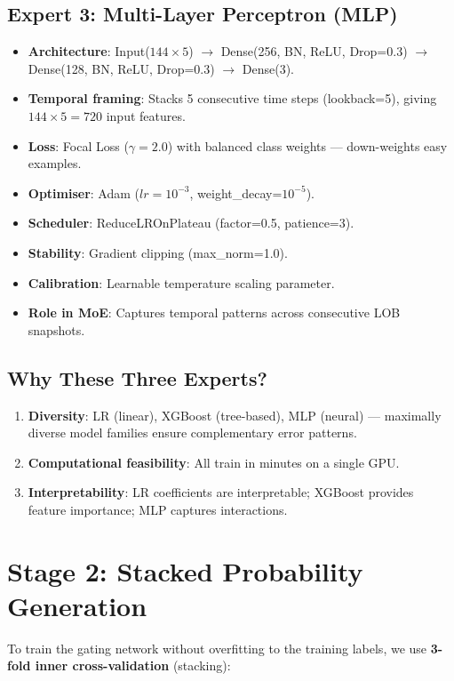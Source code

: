 \documentclass[12pt, a4paper]{article}
\begin{document}
\subsection{Expert 3: Multi-Layer Perceptron (MLP)}
\begin{itemize}
  \item \textbf{Architecture}: Input($144 \times 5$) $\to$ Dense(256, BN, ReLU, Drop=0.3) $\to$ Dense(128, BN, ReLU, Drop=0.3) $\to$ Dense(3).
  \item \textbf{Temporal framing}: Stacks 5 consecutive time steps (lookback=5), giving $144 \times 5 = 720$ input features.
  \item \textbf{Loss}: Focal Loss ($\gamma=2.0$) with balanced class weights — down-weights easy examples.
  \item \textbf{Optimiser}: Adam ($lr=10^{-3}$, weight\_decay=$10^{-5}$).
  \item \textbf{Scheduler}: ReduceLROnPlateau (factor=0.5, patience=3).
  \item \textbf{Stability}: Gradient clipping (max\_norm=1.0).
  \item \textbf{Calibration}: Learnable temperature scaling parameter.
  \item \textbf{Role in MoE}: Captures temporal patterns across consecutive LOB snapshots.
\end{itemize}

\subsection{Why These Three Experts?}
\begin{enumerate}
  \item \textbf{Diversity}: LR (linear), XGBoost (tree-based), MLP (neural) — maximally diverse model families ensure complementary error patterns.
  \item \textbf{Computational feasibility}: All train in minutes on a single GPU.
  \item \textbf{Interpretability}: LR coefficients are interpretable; XGBoost provides feature importance; MLP captures interactions.
\end{enumerate}

\section{Stage 2: Stacked Probability Generation}

To train the gating network without overfitting to the training labels, we use \textbf{3-fold inner cross-validation} (stacking):
\end{document}
